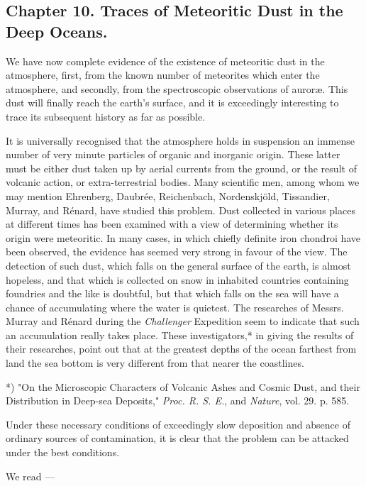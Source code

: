 \documentclass[a4paper, 12pt, oneside, polutonikogreek, english]{article}
\begin{document}
\subsection{Chapter 10. Traces of Meteoritic Dust in the Deep Oceans.}

We have now complete evidence of the existence of meteoritic dust in the atmosphere, first, from the known number of meteorites which enter the atmosphere, and secondly, from the spectroscopic observations of auroræ. This dust will finally reach the earth's surface, and it is exceedingly interesting to trace its subsequent history as far as possible.

It is universally recognised that the atmosphere holds in suspension an immense number of very minute particles of organic and inorganic origin. These latter must be either dust taken up by aerial currents from the ground, or the result of volcanic action, or extra-terrestrial bodies. Many scientific men, among whom we may mention Ehrenberg, Daubrée, Reichenbach, Nordenskjöld, Tissandier, Murray, and Rénard, have studied this problem. Dust collected in various places at different times has been examined with a view of determining whether its origin were meteoritic. In many cases, in which chiefly definite iron chondroi have been observed, the evidence has seemed very strong in favour of the view. The detection of such dust, which falls on the general surface of the earth, is almost hopeless, and that which is collected on snow in inhabited countries containing foundries and the like is doubtful, but that which falls on the sea will have a chance of accumulating where the water is quietest. The researches of Messrs. Murray and Rénard during the \emph{Challenger} Expedition seem to indicate that such an accumulation really takes place. These investigators,* in giving the results of their researches, point out that at the greatest depths of the ocean farthest from land the sea bottom is very different from that nearer the coastlines.

*) "On the Microscopic Characters of Volcanic Ashes and Cosmic Dust, and their Distribution in Deep-sea Deposits," \emph{Proc. R. S. E.}, and \emph{Nature}, vol. 29. p. 585.

Under these necessary conditions of exceedingly slow deposition and absence of ordinary sources of contamination, it is clear that the problem can be attacked under the best conditions.

We read ---
\end{document}
